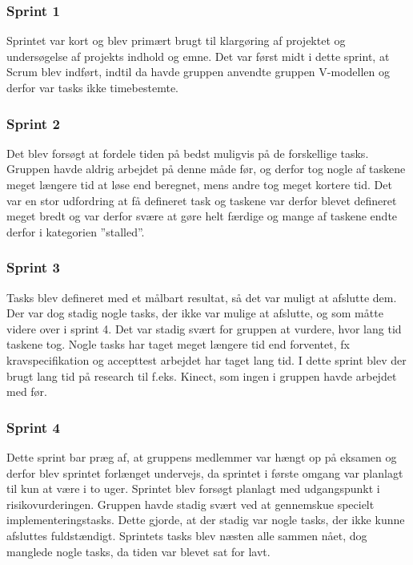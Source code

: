 \subsubsection{Sprint 1} 
Sprintet var kort og blev primært brugt til klargøring af projektet og undersøgelse af projekts indhold og emne. Det var først midt i dette sprint, at Scrum blev indført, indtil da havde gruppen anvendte gruppen V-modellen og derfor var tasks ikke timebestemte.

\subsubsection{Sprint 2} 
Det blev forsøgt at fordele tiden på bedst muligvis på de forskellige tasks. Gruppen havde aldrig arbejdet på denne måde før, og derfor tog nogle af taskene meget længere tid at løse end beregnet, mens andre tog meget kortere tid. Det var en stor udfordring at få defineret task og taskene var derfor blevet defineret meget bredt og var derfor svære at gøre helt færdige og mange af taskene endte derfor i kategorien ”stalled”. 

\subsubsection{Sprint 3} 
Tasks blev defineret med et målbart resultat, så det var muligt at afslutte dem. Der var dog stadig nogle tasks, der ikke var mulige at afslutte, og som måtte videre over i sprint 4. Det var stadig svært for gruppen at vurdere, hvor lang tid taskene tog. Nogle tasks har taget meget længere tid end forventet, fx kravspecifikation og accepttest arbejdet har taget lang tid. I dette sprint blev der brugt lang tid på research til f.eks. Kinect, som ingen i gruppen havde arbejdet med før.
 
\subsubsection{Sprint 4} 
Dette sprint bar præg af, at gruppens medlemmer var hængt op på eksamen og derfor blev sprintet forlænget undervejs, da sprintet i første omgang var planlagt til kun at være i to uger. Sprintet blev forsøgt planlagt med udgangspunkt i risikovurderingen. Gruppen havde stadig svært ved at gennemskue specielt implementeringstasks. Dette gjorde, at der stadig var nogle tasks, der ikke kunne afsluttes fuldstændigt. Sprintets tasks blev næsten alle sammen nået, dog manglede nogle tasks, da tiden var blevet sat for lavt. 

